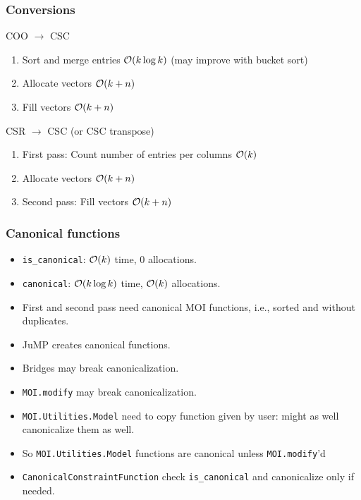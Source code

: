 \documentclass{beamer}
\begin{document}
  \begin{frame}[fragile]
    \frametitle{Conversions}
    \begin{block}{COO $\to$ CSC}
      \begin{enumerate}
        \item \alert{Sort} and merge entries $\mathcal{O}(k \log k)$ (may improve with bucket sort)
        \item \alert{Allocate} vectors $\mathcal{O}(k + n)$
        \item \alert{Fill} vectors $\mathcal{O}(k + n)$
      \end{enumerate}
    \end{block}
    \begin{block}{CSR $\to$ CSC (or CSC transpose)}
      \begin{enumerate}
        \item First \alert{pass}: \alert{Count} number of entries per columns $\mathcal{O}(k)$
        \item \alert{Allocate} vectors $\mathcal{O}(k + n)$
        \item Second \alert{pass}: \alert{Fill} vectors $\mathcal{O}(k + n)$
      \end{enumerate}
    \end{block}
  \end{frame}

  \begin{frame}[fragile]
    \frametitle{Canonical functions}
    \begin{itemize}
      \item \texttt{is\_canonical}: $\mathcal{O}(k)$ time, 0 allocations.
      \item \texttt{canonical}: $\mathcal{O}(k\log k)$ time, $\mathcal{O}(k)$ allocations.
    \end{itemize}
    \begin{itemize}
      \item First and second pass need \alert{canonical} MOI functions, i.e., sorted and without duplicates.
      \item JuMP creates \alert{canonical} functions.
      \item Bridges may \alert{break} canonicalization.
      \item \texttt{MOI.modify} may \alert{break} canonicalization.
    \end{itemize}

    \begin{itemize}
      \item \texttt{MOI.Utilities.Model} need to \alert{copy} function given by user: might as well canonicalize them as well.
      \item So \texttt{MOI.Utilities.Model} functions are \alert{canonical} unless \texttt{MOI.modify}'d
      \item \texttt{CanonicalConstraintFunction} check \texttt{is\_canonical} and canonicalize only if needed.
    \end{itemize}
  \end{frame}
\end{document}
